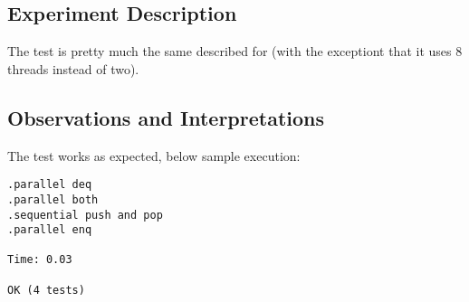 \subsection{Experiment Description}
The test is pretty much the same described for 
(with the exceptiont that it uses 8 threads instead of two).

\subsection{Observations and Interpretations}

The test works as expected, below sample execution:

\begin{verbatim}
.parallel deq
.parallel both
.sequential push and pop
.parallel enq

Time: 0.03

OK (4 tests)
\end{verbatim}
\hfill

